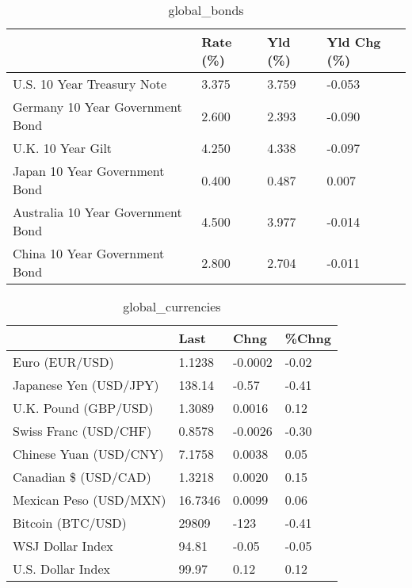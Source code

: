 \documentclass{article}%
\begin{document}
%


\begin{table}[htbp]%
\caption{global\_bonds}%
\centering%
\begin{adjustbox}{width=1\textwidth}%
\begin{tabular}{llll}
\toprule
                                  & Rate (\%) & Yld (\%) & Yld Chg (\%) \\
\midrule
       U.S. 10 Year Treasury Note &    3.375 &   3.759 &      -0.053 \\
  Germany 10 Year Government Bond &    2.600 &   2.393 &      -0.090 \\
                U.K. 10 Year Gilt &    4.250 &   4.338 &      -0.097 \\
    Japan 10 Year Government Bond &    0.400 &   0.487 &       0.007 \\
Australia 10 Year Government Bond &    4.500 &   3.977 &      -0.014 \\
    China 10 Year Government Bond &    2.800 &   2.704 &      -0.011 \\
\bottomrule
\end{tabular}
%
\end{adjustbox}%
\end{table}

%


\begin{table}[htbp]%
\caption{global\_currencies}%
\centering%
\begin{adjustbox}{width=1\textwidth}%
\begin{tabular}{llll}
\toprule
                       &    Last &    Chng & \%Chng \\
\midrule
        Euro (EUR/USD) &  1.1238 & -0.0002 & -0.02 \\
Japanese Yen (USD/JPY) &  138.14 &   -0.57 & -0.41 \\
  U.K. Pound (GBP/USD) &  1.3089 &  0.0016 &  0.12 \\
 Swiss Franc (USD/CHF) &  0.8578 & -0.0026 & -0.30 \\
Chinese Yuan (USD/CNY) &  7.1758 &  0.0038 &  0.05 \\
  Canadian \$ (USD/CAD) &  1.3218 &  0.0020 &  0.15 \\
Mexican Peso (USD/MXN) & 16.7346 &  0.0099 &  0.06 \\
     Bitcoin (BTC/USD) &   29809 &    -123 & -0.41 \\
      WSJ Dollar Index &   94.81 &   -0.05 & -0.05 \\
     U.S. Dollar Index &   99.97 &    0.12 &  0.12 \\
\bottomrule
\end{tabular}
%
\end{adjustbox}%
\end{table}
\end{document}
